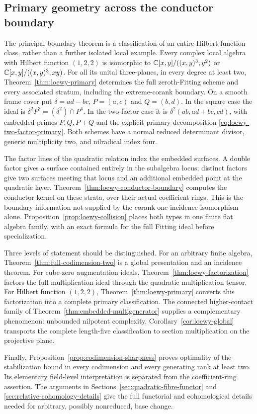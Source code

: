 \subsection*{Primary geometry across the conductor boundary}
The principal boundary theorem is a classification of an entire
Hilbert-function class, rather than a further isolated local example.
Every complex local algebra with Hilbert function $(1,2,2)$ is
isomorphic to $\mathbb C[x,y]/((x,y)^3,y^2)$ or
$\mathbb C[x,y]/((x,y)^3,xy)$. For all its unital three-planes, in every
degree at least two, Theorem~\ref{thm:loewy-primary} determines the
full zeroth-Fitting scheme and every associated stratum, including
the extreme-corank boundary. On a smooth frame cover put
$\delta=ad-bc$, $P=(a,c)$ and $Q=(b,d)$. In the square case the ideal
is $\delta^2P^2=(\delta^2)\cap P^4$. In the two-factor case it is
$\delta^2(ab,ad+bc,cd)$, with embedded primes $P,Q,P+Q$ and the
explicit primary decomposition \eqref{eq:loewy-two-factor-primary}.
Both schemes have a normal reduced determinant divisor, generic
multiplicity two, and nilradical index four.

The factor lines of the quadratic relation index the embedded
surfaces. A double factor gives a surface contained entirely in the
subalgebra locus; distinct factors give two surfaces meeting that
locus and an additional embedded point at the quadratic layer.
Theorem~\ref{thm:loewy-conductor-boundary} computes the conductor
kernel on these strata, over their actual coefficient rings. This
is the boundary information not supplied by the corank-one incidence
isomorphism alone. Proposition~\ref{prop:loewy-collision} places
both types in one finite flat algebra family, with an exact formula
for the full Fitting ideal before specialization.

Three levels of statement should be distinguished. For an arbitrary
finite algebra, Theorem~\ref{thm:full-codimension-two} is a global
presentation and an incidence theorem. For cube-zero augmentation
ideals, Theorem~\ref{thm:loewy-factorization} factors the full
multiplication ideal through the quadratic multiplication tensor.
For Hilbert function $(1,2,2)$, Theorem~\ref{thm:loewy-primary}
converts this factorization into a complete primary classification.
The connected higher-contact family of
Theorem~\ref{thm:embedded-multigenerator} supplies a complementary
phenomenon: unbounded nilpotent complexity. Corollary~\ref{cor:loewy-global}
transports the complete length-five classification to section
multiplication on the projective plane.

Finally, Proposition~\ref{prop:codimension-sharpness} proves optimality
of the stabilization bound in every codimension and every generating
rank at least two. Its elementary field-level interpretation is
separated from the coefficient-ring assertion. The arguments in
Sections~\ref{sec:quadratic-fibre-functor} and
\ref{sec:relative-cohomology-details} give the full functorial and
cohomological details needed for arbitrary, possibly nonreduced,
base change.
